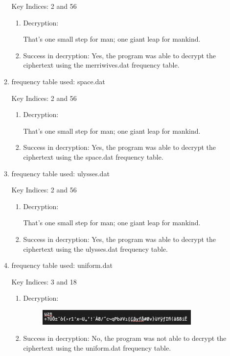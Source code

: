 \documentclass{ashoka-crypto}
\begin{document}
\begin{enumerate}
\begin{enumerate}
Key Indices: 2 and 56
\begin{enumerate}
\item Decryption:

That's one small step for man; one giant leap for mankind.

\item Success in decryption: Yes, the program was able to decrypt the ciphertext using the merriwives.dat frequency table.
\end{enumerate}
\item frequency table used: space.dat

Key Indices: 2 and 56
\begin{enumerate}
\item Decryption:

That's one small step for man; one giant leap for mankind.

\item Success in decryption: Yes, the program was able to decrypt the ciphertext using the space.dat frequency table.
\end{enumerate}
\item frequency table used: ulysses.dat

Key Indices: 2 and 56
\begin{enumerate}
\item Decryption:

That's one small step for man; one giant leap for mankind.

\item Success in decryption: Yes, the program was able to decrypt the ciphertext using the ulysses.dat frequency table.
\end{enumerate}
\clearpage
\item frequency table used: uniform.dat

Key Indices: 3 and 18
\begin{enumerate}
\item Decryption:
\begin{figure}[h]
\includegraphics[width=8cm]{3_3_uniform}
\centering
\end{figure}

\item Success in decryption: No, the program was not able to decrypt the ciphertext using the uniform.dat frequency table.
\end{enumerate}
\end{enumerate}


\end{enumerate}
\end{document}
